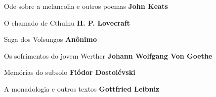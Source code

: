 \begin{multicols}{2}
\begin{enumerate}
{\item Ode sobre a melancolia e outros poemas \textbf{John Keats}
\item O chamado de Cthulhu \textbf{H. P. Lovecraft}
\item Saga dos Volsungos \textbf{Anônimo}
\item Os sofrimentos do jovem Werther \textbf{Johann Wolfgang Von Goethe}
\item Memórias do subsolo \textbf{Fiódor Dostoiévski}
\item A monadologia e outros textos \textbf{Gottfried Leibniz}
}
\end{enumerate}
\end{multicols}

\pagebreak
